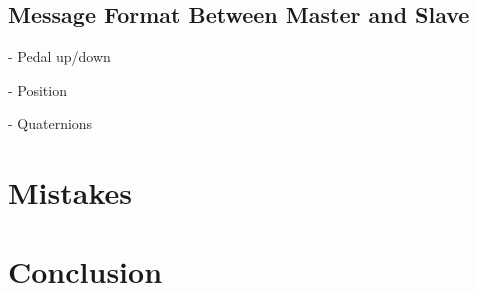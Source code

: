 \documentclass[letterpaper,twocolumn,10pt]{article}
\begin{document}
\subsection{Message Format Between Master and Slave}
- Pedal up/down

- Position

- Quaternions

\section{Mistakes}

\section{Conclusion}



\end{document}
